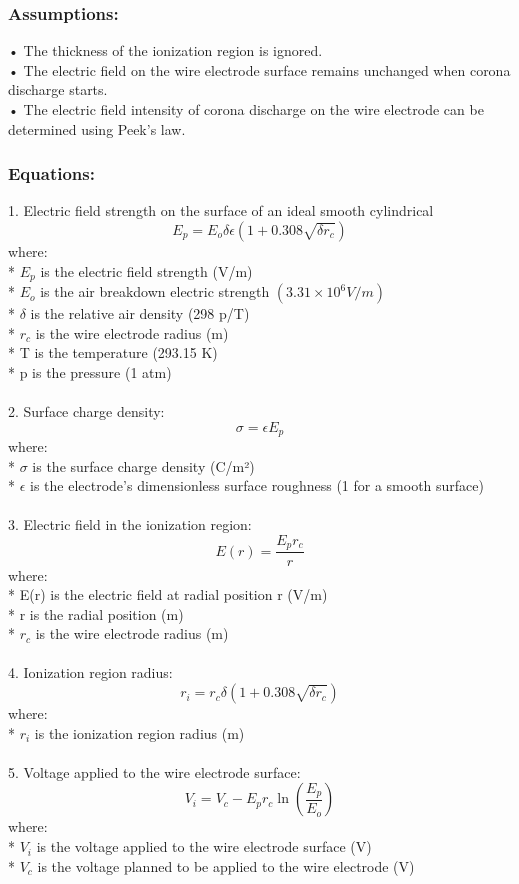 \subsubsection*{Assumptions:}
•	The thickness of the ionization region is ignored.\\
•	The electric field on the wire electrode surface remains unchanged when corona discharge starts.\\
•	The electric field intensity of corona discharge on the wire electrode can be determined using Peek's law.
\subsubsection*{Equations:}
1. Electric field strength on the surface of an ideal smooth cylindrical 
$$ E_p = E_o \delta\epsilon (1+ 0.308\sqrt{\delta r_c}) $$
  where:\\
* $E_p$ is the electric field strength (V/m)\\
* $E_o$ is the air breakdown electric strength $(3.31 × 10^6 V/m)$\\ \cite{Elsalakawy}
* $\delta$ is the relative air density (298 p/T)\\
* $r_c$ is the wire electrode radius (m)\\
* T is the temperature (293.15 K)\\
* p is the pressure (1 atm)\\\\
2. Surface charge density:
$$\sigma = \epsilon E_p$$
where:\\
* $\sigma$ is the surface charge density (C/m²)\\
* $\epsilon$ is the electrode's dimensionless surface roughness (1 for a smooth surface)\\\\
3. Electric field in the ionization region:
$$E(r) = \frac{E_p r_c}{r} $$
where:\\
* E(r) is the electric field at radial position r (V/m)\\
* r is the radial position (m)\\
* $r_c$ is the wire electrode radius (m)\\\\
4. Ionization region radius:
$$ r_i = r_c \delta (1+ 0.308\sqrt{\delta r_c}) $$
where:\\
* $r_i$ is the ionization region radius (m)\\\\
5. Voltage applied to the wire electrode surface:
$$V_i = V_c - E_p r_c \ln{(\frac{E_p}{E_o})}$$
where:\\
* $V_i$ is the voltage applied to the wire electrode surface (V)\\
* $V_c$ is the voltage planned to be applied to the wire electrode (V)\\


